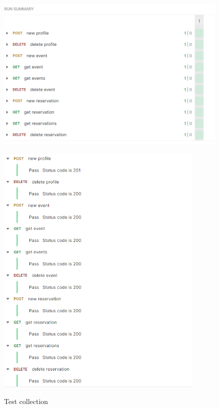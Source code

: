 \begin{figure}[h!]
\begin{center}
  \includegraphics[width=14cm]{Iterazione 2/test/postman/collections.PNG}\\
  \caption{Test collection}
  \includegraphics[width=10cm]{Iterazione 2/test/postman/collections sng.PNG}\\
\end{center}
\end{figure}
